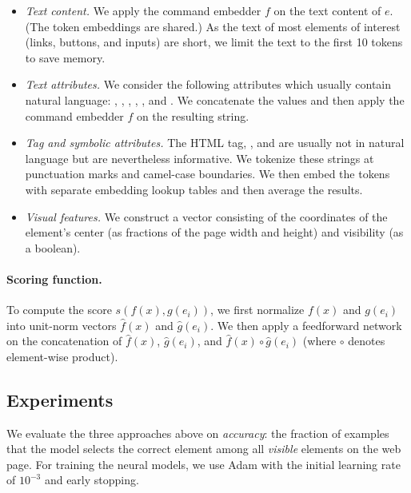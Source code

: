 \begin{itemize}
\item \emph{Text content.}
We apply the command embedder $f$ on the text content of $e$.
(The token embeddings are shared.)
As the text of most elements of interest
(links, buttons, and inputs) are short,
we limit the text to the first 10 tokens to save memory.

\item \emph{Text attributes.}
We consider the following attributes
which usually contain natural language:
, , ,
, , and .
We concatenate the values and then apply the
command embedder $f$ on the resulting string.

\item \emph{Tag and symbolic attributes.}
The HTML tag, , and 
are usually not in natural language
but are nevertheless informative.
We tokenize these strings at punctuation marks
and camel-case boundaries.
We then embed the tokens with separate embedding lookup tables
and then average the results.

\item \emph{Visual features.}
We construct a vector consisting of the coordinates of
the element's center (as fractions of the page width and height)
and visibility (as a boolean).

\end{itemize}

\paragraph{Scoring function.}
To compute the score $s(f(x), g(e_i))$,
we first normalize $f(x)$ and $g(e_i)$ into
unit-norm vectors $\hat f(x)$ and $\hat g(e_i)$.
We then apply a feedforward network on
the concatenation of $\hat f(x)$, $\hat g(e_i)$,
and $\hat f(x) \circ \hat g(e_i)$
(where $\circ$ denotes element-wise product).



\subsection{Experiments}
We evaluate the three approaches above on \emph{accuracy}:
the fraction of examples that the model selects
the correct element among all \emph{visible} elements
on the web page.
For training the neural models,
we use Adam \cite{kingma2014adam} with the initial
learning rate of $10^{-3}$ and early stopping.

